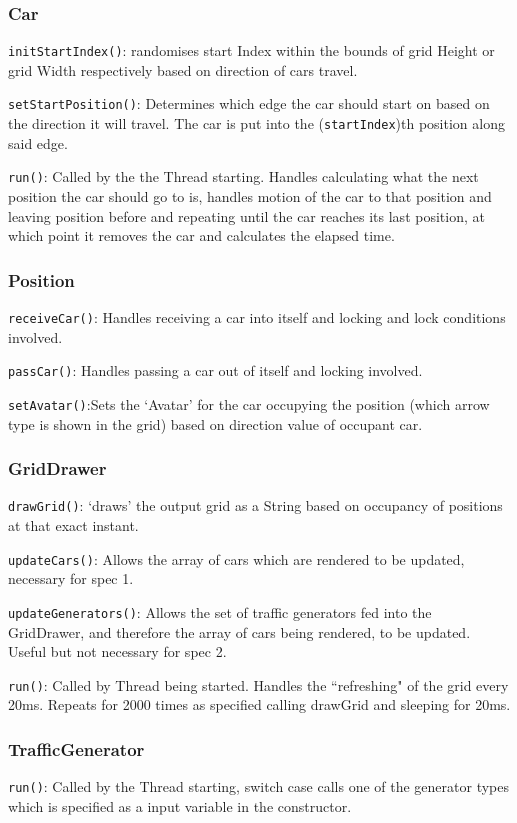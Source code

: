 \documentclass[11pt, oneside]{article}
\begin{document}
\subsubsection*{Car}
\texttt{initStartIndex()}: randomises start Index within the bounds of grid Height or grid Width respectively based on direction of cars travel.

\texttt{setStartPosition()}: Determines which edge the car should start on based on the direction it will travel. The car is put into the (\texttt{startIndex})th position along said edge.

\texttt{run()}: Called by the the Thread starting. Handles calculating what the next position the car should go to is, handles motion of the car to that position and leaving position before and repeating until the car reaches its last position, at which point it removes the car and calculates the elapsed time.

\subsubsection*{Position}
\texttt{receiveCar()}: Handles receiving a car into itself and locking and lock conditions involved.

\texttt{passCar()}: Handles passing a car out of itself and locking involved.

\texttt{setAvatar()}:Sets the `Avatar' for the car occupying the position (which arrow type is shown in the grid) based on direction value of occupant car.

\subsubsection*{GridDrawer}
\texttt{drawGrid()}: `draws' the output grid as a String based on occupancy of positions at that exact instant. 

\texttt{updateCars()}: Allows the array of cars which are rendered to be updated, necessary for spec 1.

\texttt{updateGenerators()}: Allows the set of traffic generators fed into the GridDrawer, and therefore the array of cars being rendered, to be updated. Useful but not necessary for spec 2.

\texttt{run()}: Called by Thread being started. Handles the ``refreshing" of the grid every 20ms. Repeats for 2000 times as specified calling drawGrid and sleeping for 20ms.

\subsubsection*{TrafficGenerator}
\texttt{run()}: Called by the Thread starting, switch case calls one of the generator types which is specified as a input variable in the constructor.
\end{document}
